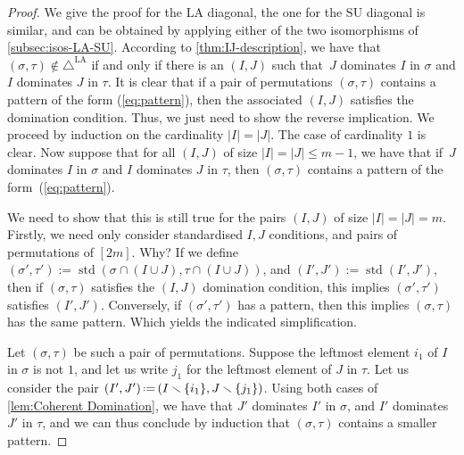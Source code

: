 \documentclass{amsart}
\theoremstyle{definition}
\newcommand{\ssm}{\smallsetminus} %
\newcommand{\eqdef}{\mbox{\,\raisebox{0.2ex}{\scriptsize\ensuremath{\mathrm:}}\ensuremath{=}\,}} %
\DeclareMathOperator{\std}{std}
\newcommand{\SU}{\mathrm{SU}}
\newcommand{\LA}{\mathrm{LA}}
\newcommand{\LAD}{\triangle^{\mathrm{LA}}}
\begin{document}
\begin{proof}
We give the proof for the $\LA$ diagonal, the one for the $\SU$ diagonal is similar, and can be obtained by applying either of the two isomorphisms of \cref{subsec:isos-LA-SU}.
According to \cref{thm:IJ-description}, we have that $(\sigma,\tau) \notin \LAD$ if and only if there is an $(I,J)$ such that~$J$ dominates $I$ in $\sigma$ and $I$ dominates $J$ in $\tau$.
It is clear that if a pair of permutations $(\sigma,\tau)$ contains a pattern of the form (\ref{eq:pattern}), then the associated $(I,J)$ satisfies the domination condition.
Thus, we just need to show the reverse implication. 
We proceed by induction on the cardinality $|I|=|J|$. 
The case of cardinality $1$ is clear. 
Now suppose that for all $(I,J)$ of size $|I|=|J|\leq m-1$, we have that if~$J$ dominates $I$ in $\sigma$ and $I$ dominates $J$ in $\tau$, then $(\sigma,\tau)$ contains a pattern of the form~(\ref{eq:pattern}).

We need to show that this is still true for the pairs $(I,J)$ of size $|I|=|J|=m$.
Firstly, we need only consider standardised $I,J$ conditions, and pairs of permutations of $[2m]$.
Why?
If we define $(\sigma',\tau') := \std(\sigma \cap (I\cup J),\tau \cap (I\cup J))$, and $(I',J'):=\std(I',J')$, 
then if $(\sigma,\tau)$ satisfies the $(I,J)$ domination condition, this implies $(\sigma',\tau')$ satisfies $(I',J')$.
Conversely, if $(\sigma',\tau')$ has a pattern, then this implies $(\sigma,\tau)$ has the same pattern.
Which yields the indicated simplification.

Let $(\sigma,\tau)$ be such a pair of permutations.
Suppose the leftmost element $i_1$ of $I$ in $\sigma$ is not $1$, and let us write $j_1$ for the leftmost element of $J$ in $\tau$.
Let us consider the pair $(I',J') \eqdef (I\ssm \{i_1\}, J \ssm \{j_1\})$.
Using both cases of \cref{lem:Coherent Domination}, we have that $J'$ dominates $I'$ in $\sigma$, and $I'$ dominates $J'$ in $\tau$, and we can thus conclude by induction that $(\sigma,\tau)$ contains a smaller pattern.


\end{proof}
\end{document}
